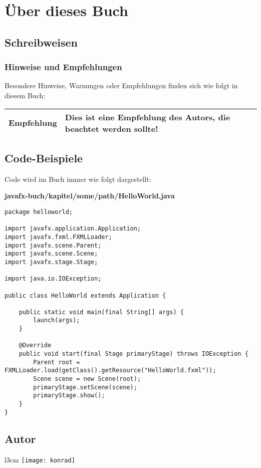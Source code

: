 \section{Über dieses Buch}

\subsection{Schreibweisen}
\subsubsection{Hinweise und Empfehlungen}
Besondere Hinweise, Warnungen oder Empfehlungen finden sich wie folgt in diesem Buch:

\begin{tabular}[h]{|p{2cm}|p{9cm}|}
\hline
\textbf{Empfehlung} & Dies ist eine Empfehlung des Autors, die beachtet werden sollte! \\
\hline
\end{tabular}

\subsection{Code-Beispiele}
Code wird im Buch immer wie folgt dargestellt:

\textbf{javafx-buch/kapitel/some/path/HelloWorld.java}
\begin{lstlisting}
package helloworld;

import javafx.application.Application;
import javafx.fxml.FXMLLoader;
import javafx.scene.Parent;
import javafx.scene.Scene;
import javafx.stage.Stage;

import java.io.IOException;

public class HelloWorld extends Application {

    public static void main(final String[] args) {
        launch(args);
    }

    @Override
    public void start(final Stage primaryStage) throws IOException {
        Parent root = FXMLLoader.load(getClass().getResource("HelloWorld.fxml"));
        Scene scene = new Scene(root);
        primaryStage.setScene(scene);
        primaryStage.show();
    }
}
\end{lstlisting}

\subsection{Autor}

\begin{wrapfigure}{l}{3cm}
    \texttt{[image: konrad]}
\end{wrapfigure}

